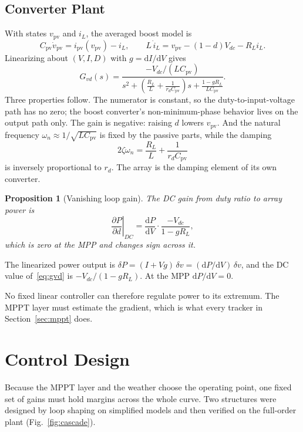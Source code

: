 \documentclass[journal]{IEEEtran}
\newtheorem{proposition}{Proposition}
\newcommand{\vpv}{v_{\mathrm{pv}}}
\newcommand{\ipv}{i_{\mathrm{pv}}}
\begin{document}
\subsection{Converter Plant}
\label{sec:plant}
With states $\vpv$ and $i_L$, the averaged boost model is
\begin{equation}
C_{\mathrm{pv}}\dot v_{\mathrm{pv}} = \ipv(\vpv) - i_L,\qquad
L\,\dot i_L = \vpv - (1-d)V_{dc} - R_L i_L .
\label{eq:avg}
\end{equation}
Linearizing about $(V,I,D)$ with $g=\mathrm{d}I/\mathrm{d}V$ gives
\begin{equation}
G_{vd}(s) = \frac{-V_{dc}/(LC_{\mathrm{pv}})}{s^2 + \left(\frac{R_L}{L} + \frac{1}{r_d C_{\mathrm{pv}}}\right)s + \frac{1-gR_L}{LC_{\mathrm{pv}}}} .
\label{eq:gvd}
\end{equation}
Three properties follow. The numerator is constant, so the duty-to-input-voltage path has no zero; the
boost converter's non-minimum-phase behavior lives on the output path only. The gain is negative: raising $d$
lowers $\vpv$. And the natural frequency $\omega_n\approx 1/\sqrt{LC_{\mathrm{pv}}}$ is fixed by the passive
parts, while the damping
\begin{equation}
2\zeta\omega_n = \frac{R_L}{L} + \frac{1}{r_d C_{\mathrm{pv}}}
\label{eq:zeta}
\end{equation}
is inversely proportional to $r_d$. The array is the damping element of its own converter.

\begin{proposition}[Vanishing loop gain]
\label{prop:vanish}
The DC gain from duty ratio to array power is
\begin{equation}
\left.\frac{\partial P}{\partial d}\right|_{DC} = \frac{\mathrm{d}P}{\mathrm{d}V}\cdot\frac{-V_{dc}}{1-gR_L},
\label{eq:pgain}
\end{equation}
which is zero at the MPP and changes sign across it.
\end{proposition}
\begin{IEEEproof}
The linearized power output is $\delta P = (I+Vg)\,\delta v = (\mathrm{d}P/\mathrm{d}V)\,\delta v$, and the DC
value of~\eqref{eq:gvd} is $-V_{dc}/(1-gR_L)$. At the MPP $\mathrm{d}P/\mathrm{d}V=0$.
\end{IEEEproof}

No fixed linear controller can therefore regulate power to its extremum. The MPPT layer must estimate the
gradient, which is what every tracker in Section~\ref{sec:mppt} does.

\section{Control Design}
\label{sec:control}
Because the MPPT layer and the weather choose the operating point, one fixed set of gains must hold
margins across the whole curve. Two structures were designed by loop shaping on simplified models and then
verified on the full-order plant (Fig.~\ref{fig:cascade}).
\end{document}

